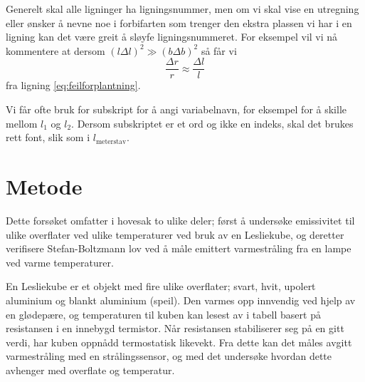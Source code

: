 
Generelt skal alle ligninger ha ligningsnummer, men om vi skal vise en utregning eller ønsker å nevne noe i forbifarten som trenger den ekstra plassen vi har i en ligning kan det være greit å sløyfe ligningsnummeret. For eksempel vil vi nå kommentere at dersom $(l \Delta l)^2 \gg (b \Delta b)^2$ så får vi
\begin{equation*}
\frac{\Delta r}{r}\approx\frac{\Delta l}{l}
\end{equation*}
fra ligning \eqref{eq:feilforplantning}. 


Vi får ofte bruk for subskript for å angi variabelnavn, for eksempel for å skille mellom $l_1$ og $l_2$. Dersom subskriptet er et ord og ikke en indeks, skal det brukes rett font, slik som i $l_\text{meterstav}$.



\section{Metode}
Dette forsøket omfatter i hovesak to ulike deler; først å undersøke emissivitet til ulike overflater ved ulike temperaturer ved bruk av en Lesliekube, og deretter verifisere Stefan-Boltzmann lov ved å måle emittert varmestråling fra en lampe ved varme temperaturer.

En Lesliekube er et objekt med fire ulike overflater; svart, hvit, upolert aluminium og blankt aluminium (speil). Den varmes opp innvendig ved hjelp av en glødepære, og temperaturen til kuben kan lesest av i tabell basert på resistansen i en innebygd termistor. Når resistansen stabiliserer seg på en gitt verdi, har kuben oppnådd termostatisk likevekt. Fra dette kan det måles avgitt varmestråling med en strålingssensor, og med det undersøke hvordan dette avhenger med overflate og temperatur.

